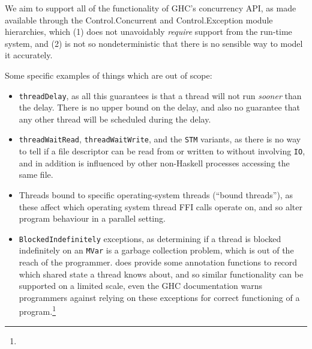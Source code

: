 We aim to support all of the functionality of GHC's concurrency API,
as made available through the Control.Concurrent and Control.Exception
module hierarchies, which (1) does not unavoidably \emph{require}
support from the run-time system, and (2) is not so nondeterministic
that there is no sensible way to model it accurately.

Some specific examples of things which are out of scope:

\begin{itemize}
\item \verb|threadDelay|, as all this guarantees is that a thread will
  not run \textit{sooner} than the delay. There is no upper bound on
  the delay, and also no guarantee that any other thread will be
  scheduled during the delay.

\item \verb|threadWaitRead|, \verb|threadWaitWrite|, and the
  \verb|STM| variants, as there is no way to tell if a file descriptor
  can be read from or written to without involving \verb|IO|, and in
  addition is influenced by other non-Haskell processes accessing the
  same file.

\item Threads bound to specific operating-system threads (``bound
  threads''), as these affect which operating system thread FFI calls
  operate on, and so alter program behaviour in a parallel setting.

\item \verb|BlockedIndefinitely| exceptions, as determining if a
  thread is blocked indefinitely on an \verb|MVar| is a garbage
  collection problem, which is out of the reach of the
  programmer. \dejafu{} does provide some annotation functions to
  record which shared state a thread knows about, and so similar
  functionality can be supported on a limited scale, even the GHC
  documentation warns programmers against relying on these exceptions
  for correct functioning of a program.\footnote{ }
\end{itemize}
